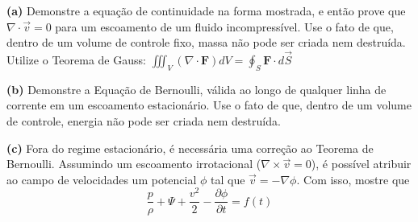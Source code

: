 \textbf{(a)} Demonstre a equação de continuidade na forma mostrada, e então prove que $\nabla\cdot\vec{v} = 0$ para um escoamento de um fluido incompressível. Use o fato de que, dentro de um volume de controle fixo, massa não pode ser criada nem destruída. Utilize o Teorema de Gauss: $\iiint_V (\nabla\cdot\mathbf{F})dV = \oint_S \mathbf{F}\cdot d\vec{S}$

\textbf{(b)} Demonstre a Equação de Bernoulli, válida ao longo de qualquer linha de corrente em um escoamento estacionário. Use o fato de que, dentro de um volume de controle, energia não pode ser criada nem destruída.

\textbf{(c)} Fora do regime estacionário, é necessária uma correção ao Teorema de Bernoulli. Assumindo um escoamento irrotacional ($\nabla\times\vec{v} = 0$), é possível atribuir ao campo de velocidades um potencial $\phi$ tal que $\vec{v} = -\nabla\phi$. Com isso, mostre que
\[ \frac{p}{\rho} + \Psi + \frac{v^2}{2} - \frac{\partial\phi}{\partial t} = f(t) \]
